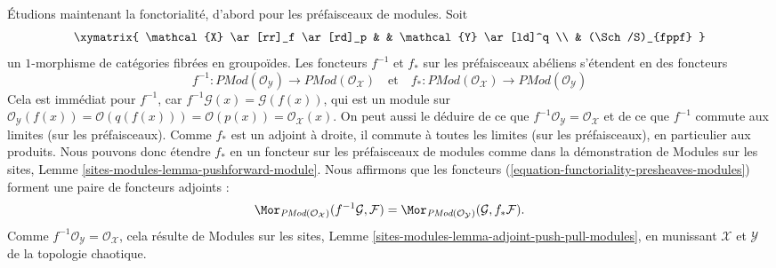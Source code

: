 \medskip\noindent
Étudions maintenant la fonctorialité, d'abord pour les préfaisceaux de modules. Soit
$$
\xymatrix{
\mathcal{X} \ar[rr]_f \ar[rd]_p & &  \mathcal{Y} \ar[ld]^q \\
& (\Sch/S)_{fppf}
}
$$
un $1$-morphisme de catégories fibrées en groupoïdes.
Les foncteurs $f^{-1}$ et $f_*$ sur les préfaisceaux abéliens s'étendent en des foncteurs
\begin{equation}
\label{equation-functoriality-presheaves-modules}
f^{-1} :
\textit{PMod}(\mathcal{O}_\mathcal{Y})
\longrightarrow
\textit{PMod}(\mathcal{O}_\mathcal{X})
\quad\text{et}\quad
f_* :
\textit{PMod}(\mathcal{O}_\mathcal{X})
\longrightarrow
\textit{PMod}(\mathcal{O}_\mathcal{Y})
\end{equation}
Cela est immédiat pour $f^{-1}$, car
$f^{-1}\mathcal{G}(x) = \mathcal{G}(f(x))$, qui est un module sur
$\mathcal{O}_\mathcal{Y}(f(x)) = \mathcal{O}(q(f(x))) = \mathcal{O}(p(x)) =
\mathcal{O}_\mathcal{X}(x)$. On peut aussi le déduire de ce que
$f^{-1}\mathcal{O}_\mathcal{Y} = \mathcal{O}_\mathcal{X}$
et de ce que $f^{-1}$ commute aux limites (sur les préfaisceaux).
Comme $f_*$ est un adjoint à droite, il commute à toutes les limites
(sur les préfaisceaux), en particulier aux produits. Nous pouvons donc étendre
$f_*$ en un foncteur sur les préfaisceaux de modules comme dans la démonstration de
Modules sur les sites, Lemme \ref{sites-modules-lemma-pushforward-module}.
Nous affirmons que les foncteurs (\ref{equation-functoriality-presheaves-modules})
forment une paire de foncteurs adjoints :
$$
\Mor_{\textit{PMod}(\mathcal{O}_\mathcal{X})}(
f^{-1}\mathcal{G}, \mathcal{F})
=
\Mor_{\textit{PMod}(\mathcal{O}_\mathcal{Y})}(
\mathcal{G}, f_*\mathcal{F}).
$$
Comme $f^{-1}\mathcal{O}_\mathcal{Y} = \mathcal{O}_\mathcal{X}$,
cela résulte de
Modules sur les sites, Lemme \ref{sites-modules-lemma-adjoint-push-pull-modules},
en munissant $\mathcal{X}$ et $\mathcal{Y}$ de la topologie
chaotique.

